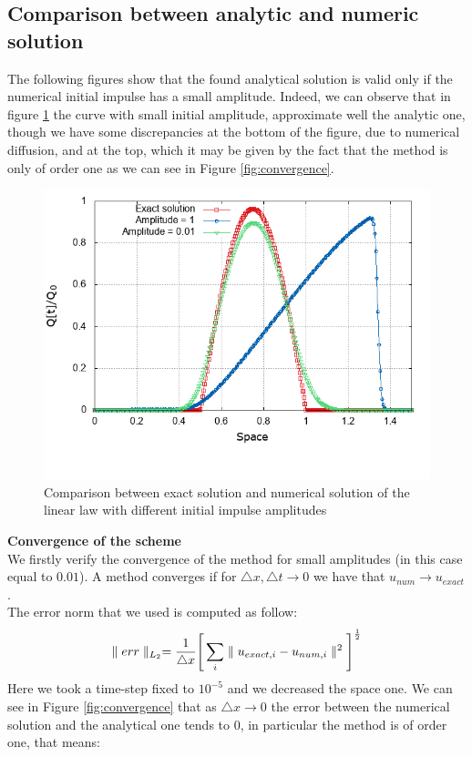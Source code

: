 \documentclass[12pt,a4paper]{article}
\numberwithin{equation}{section}
\begin{document}
\subsection{Comparison between analytic and numeric solution}
The following figures show that the found analytical solution is valid only if the numerical initial impulse has a small amplitude. Indeed, we can observe that in figure \ref{fig:different amplitudes linear} the curve with small initial amplitude, approximate well the analytic one, though we have some discrepancies at the bottom of the figure, due to numerical diffusion, and at the top, which it may be given by the fact that the method is only of order one as we can see in Figure \ref{fig:convergence}.
\begin{figure}[H]
  \centering
    \includegraphics[width=12cm]{exact_linear.png}
    \caption{Comparison between exact solution and numerical solution of the linear law with different initial impulse amplitudes}
    \label{fig:different amplitudes linear}
\end{figure}
\noindent
{\bf Convergence of the scheme}\\
We firstly verify the convergence of the method for small amplitudes (in this case equal to $0.01$). A method converges if for $\triangle x, \triangle t \rightarrow 0$ we have that $u_{num} \rightarrow u_{exact}$. \\
The error norm that we used is computed as follow:
\begin{equation*}
\parallel err \parallel_{L_2} = \frac{1}{\triangle x} \Bigg[\sum_i \parallel u_{exact, i} - u_{num, i} \parallel^2\Bigg]^{1\over 2}
\end{equation*}
Here we took a time-step fixed to $10^{-5}$ and we decreased the space one. We can see in Figure \ref{fig:convergence} that as $\triangle x \rightarrow 0$ the error between the numerical solution and the analytical one tends to $0$, in particular the method is of order one, that means:
\end{document}
